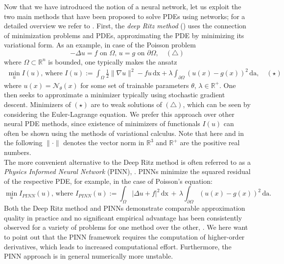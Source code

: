 \documentclass[12pt,openany]{book}
\newcommand{\R}{\mathbb{R}}
\theoremstyle{plainnormal}
\theoremstyle{remark}
\begin{document}
Now that we have introduced the notion of a neural network, let us exploit the two main methods that have been proposed to solve PDEs using networks; for a detailed overview we refer to \cite{E_2021}. First, the \emph{deep Ritz method} (\cite{deepritzmethoddeep}) uses the connection of minimization problems and PDEs, approximating the PDE by minimizing its variational form. As an example, in case of the Poisson problem $$-\Delta u = f \text{ on } \Omega,\, u = g \text{ on } \partial \Omega, \quad (\triangle)
$$ where $\Omega \subset \R^n $ is bounded, one typically makes the ansatz \begin{align*}
    \min_u I(u)\text{, where } I(u) := \int_\Omega \frac{1}{2} \|\nabla u\|^2 - fu \,\mathrm{dx} + \lambda\int_{\partial \Omega} (u(x)- g(x))^2\, \mathrm{da},\quad(\star)
\end{align*}
where $u(x) = \mathcal N_\theta(x)$ for some set of trainable parameters $\theta$, $\lambda\in \R^+$. One then seeks to approximate a minimizer typically using stochastic gradient descent. Minimizers of $(\star)$ are to weak solutions of $(\triangle)$, which can be seen by considering the Euler-Lagrange equation. We prefer this approach over other neural PDE methods, since existence of minimizers of functionals $I(u)$ can often be shown using the methods of variational calculus. Note that here and in the following $\|\cdot\|$ denotes the vector norm in $\R^3$ and $\R^+$ are the positive real numbers.\\
The more convenient alternative to the Deep Ritz method is often referred to as a \emph{Physics Informed Neural Network} (PINN), \cite{RAISSI2019686}. PINNs minimize the squared residual of the respective PDE, for example, in the case of Poisson's equation:
$$ \min_u I_{PINN}(u)\text{, where } I_{PINN}(u) := \int_\Omega |\Delta u + f|^2 \,\mathrm{dx}\, +\, \lambda \int_{\partial\Omega}(u(x) - g(x))^2 \, \mathrm{da}  .$$
Both the Deep Ritz method and PINNs demonstrate comparable approximation quality in practice and no significant empirical advantage has been consistently observed for a variety of problems for one method over the other, \cite{yang2025numericalstudyhyperparameter}. 
We here want to point out that the PINN framework requires the computation of higher-order derivatives, which leads to increased computational effort. Furthermore, the PINN approach is in general numerically more unstable.
\end{document}
